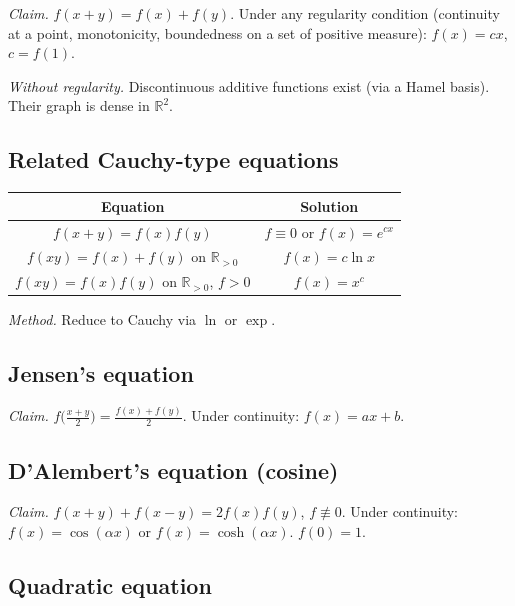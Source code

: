 \textit{Claim.} $f(x+y)=f(x)+f(y)$. Under any regularity condition (continuity at a point, monotonicity, boundedness on a set of positive measure): $f(x)=cx$, $c=f(1)$.

\textit{Without regularity.} Discontinuous additive functions exist (via a Hamel basis). Their graph is dense in $\mathbb{R}^2$.

\medskip

\subsection{Related Cauchy-type equations}
\label{subsec:cauchy-related}

\begin{center}
\begin{tabular}{|c|c|}
\hline
Equation & Solution \\
\hline
$f(x+y)=f(x)f(y)$ & $f\equiv0$ or $f(x)=e^{cx}$ \\
$f(xy)=f(x)+f(y)$ on $\mathbb{R}_{>0}$ & $f(x)=c\ln x$ \\
$f(xy)=f(x)f(y)$ on $\mathbb{R}_{>0}$, $f>0$ & $f(x)=x^c$ \\
\hline
\end{tabular}
\end{center}

\textit{Method.} Reduce to Cauchy via $\ln$ or $\exp$.

\medskip

\subsection{Jensen's equation}
\label{subsec:jensen-equation}

\textit{Claim.} $f\bigl(\frac{x+y}{2}\bigr)=\frac{f(x)+f(y)}{2}$. Under continuity: $f(x)=ax+b$.

\medskip

\subsection{D'Alembert's equation (cosine)}
\label{subsec:dalembert}

\textit{Claim.} $f(x+y)+f(x-y)=2f(x)f(y)$, $f\not\equiv0$. Under continuity: $f(x)=\cos(\alpha x)$ or $f(x)=\cosh(\alpha x)$. $f(0)=1$.

\medskip

\subsection{Quadratic equation}
\label{subsec:quadratic-equation}

